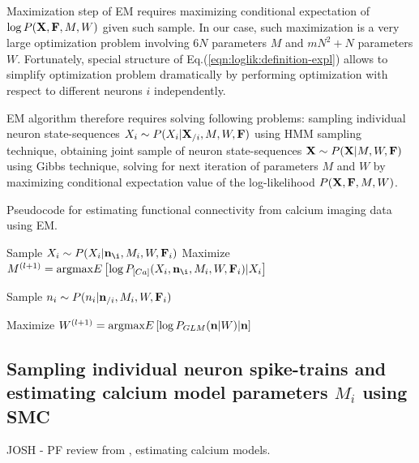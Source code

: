 \documentclass[amsmath,amssymb]{revtex4}
\begin{document}
Maximization step of EM requires maximizing conditional expectation of $\log P({\bf X},{\bf F},M,W)$ given such sample. In our case, such maximization is a very large optimization problem involving $6N$ parameters $M$ and $mN^2+N$ parameters $W$. Fortunately, special structure of Eq.(\ref{eqn:loglik:definition-expl}) allows to simplify optimization problem dramatically by performing optimization with respect to different neurons $i$ independently.

EM algorithm therefore requires solving following problems: 
sampling individual neuron state-sequences $X_i\sim P(X_{i}|{\bf X}_{/i},M,W,{\bf F})$ using HMM sampling technique,
obtaining joint sample of neuron state-sequences ${\bf X}\sim P({\bf X}|M,W,{\bf F})$ using Gibbs technique,
solving for next iteration of parameters $M$ and $W$ by maximizing conditional expectation value of the log-likelihood $P({\bf X},{\bf F},M,W)$.

\begin{algorithm}
\caption{Pseudocode for estimating functional connectivity from calcium imaging data using EM.}\label{eqn:pseudocode}
\begin{algorithmic}
      \State Sample $X_i \sim P(X_i|{\bf n}_{\i},M_i,W,{\bf F}_i)$
      \State Maximize $M^{(l+1)}=\text{argmax} E\left[\log P_{[Ca]}(X_i,{\bf n}_{\i},M_i,W,{\bf F}_i)|X_i\right]$
    \EndWhile
  \EndFor
  
      \State Sample $n_i \sim P(n_i|{\bf n}_{/i},M_i,W,{\bf F}_i)$
    \EndFor
  \EndFor 

  \State Maximize $W^{(l+1)}=\text{argmax} E\left[\log P_{GLM}({\bf n}|W)|{\bf n}\right]$  
\EndWhile
\end{algorithmic}
\end{algorithm}

\subsection{\label{sec:methods:sampling_neuron}Sampling individual neuron spike-trains and estimating calcium model parameters $M_i$ using SMC}
JOSH - PF review from \cite{Vogelstein2009}, estimating calcium models.
\end{document}
